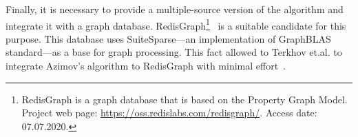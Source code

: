 Finally, it is necessary to provide a multiple-source version of the algorithm and integrate it with a graph database.
RedisGraph\footnote{RedisGraph is a graph database that is based on the Property Graph
Model. Project web page: \url{https://oss.redislabs.com/redisgraph/}. Access date:
07.07.2020.}~\cite{8778293} is a suitable candidate for this purpose.
This database uses SuiteSparse---an implementation of GraphBLAS standard---as a base for graph processing.
This fact allowed to Terkhov et.al.  to integrate Azimov's algorithm to RedisGraph with minimal effort~\cite{10.1145/3398682.3399163}.
